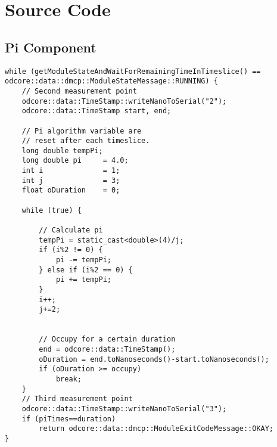 \chapter{Source Code}
\section{Pi Component}


\begin{lstlisting}[frame=single,label={code:pi}]
while (getModuleStateAndWaitForRemainingTimeInTimeslice() == odcore::data::dmcp::ModuleStateMessage::RUNNING) {
	// Second measurement point
    odcore::data::TimeStamp::writeNanoToSerial("2");
    odcore::data::TimeStamp start, end;

    // Pi algorithm variable are
    // reset after each timeslice.
    long double tempPi;
    long double pi     = 4.0;
    int i              = 1;
    int j              = 3;
    float oDuration    = 0;

    while (true) {

        // Calculate pi
        tempPi = static_cast<double>(4)/j;
        if (i%2 != 0) {
            pi -= tempPi;
        } else if (i%2 == 0) {
            pi += tempPi;
        }
        i++;
        j+=2;


        // Occupy for a certain duration
        end = odcore::data::TimeStamp();
        oDuration = end.toNanoseconds()-start.toNanoseconds();
        if (oDuration >= occupy)
            break;
    }
    // Third measurement point
    odcore::data::TimeStamp::writeNanoToSerial("3");
    if (piTimes==duration)
        return odcore::data::dmcp::ModuleExitCodeMessage::OKAY;
}
\end{lstlisting}

\newpage
